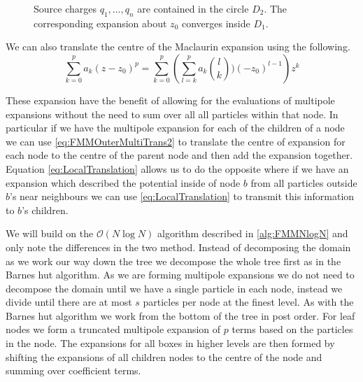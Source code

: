 \begin{figure}
    \centering
        \resizebox{.6\linewidth}{!}{}
    \caption{Source charges $q_1,\dots,q_n$ are contained in the circle $D_2$. The corresponding expansion about $z_0$ converges inside $D_1$.}
    \label{fig:Translation}
\end{figure}


We can also translate the centre of the Maclaurin expansion using the following. 
\begin{equation}
    \label{eq:LocalTranslation}
    \sum_{k=0}^p a_k(z-z_0)^p = \sum_{k=0}^{p} \left( \sum_{l=k}^p a_k \binom{l}{k})(-z_0)^{l-1} \right)z^k
\end{equation}

These expansion have the benefit of allowing for the evaluations of multipole expansions without the need to sum over all all particles within that node. In particular if we have the multipole expansion for each of the children of a node we can use \cref{eq:FMMOuterMultiTrans2} to translate the centre of expansion for each node to the centre of the parent node and then add the expansion together. Equation \ref{eq:LocalTranslation} allows us to do the opposite where if we have an expansion which described the potential inside of node $b$ from all particles outside $b$'s near neighbours we can use \cref{eq:LocalTranslation} to transmit this information to $b$'s children.

We will build on the $\mathcal{O}(N\log N)$ algorithm described in \cref{alg:FMMNlogN} and only note the differences in the two method. Instead of decomposing the domain as we work our way down the tree we decompose the whole tree first as in the Barnes hut algorithm. As we are forming multipole expansions we do not need to decompose the domain until we have a single particle in each node, instead we divide until there are at most $s$ particles per node at the finest level. As with the Barnes hut algorithm we work from the bottom of the tree in post order. For leaf nodes we form a truncated multipole expansion of $p$ terms based on the particles in the node. The expansions for all boxes in higher levels are then formed by shifting the expansions of all children nodes to the centre of the node and summing over coefficient terms.

